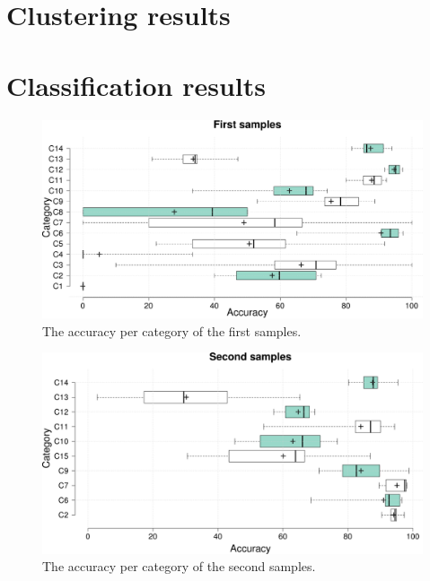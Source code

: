 \label{evaluation}



\section{Clustering results}\label{clusteringEvaluation}

\section{Classification results}\label{classificationEvaluation}

 \begin{figure}[h]
    \centering
    \includegraphics[width =\textwidth]{Images/CM1Boxplot.png}
    \caption{The accuracy per category of the first samples.}
    \label{CM1Boxplot}
\end{figure}

 \begin{figure}[h]
    \centering
    \includegraphics[width =\textwidth]{Images/CM2Boxplot.png}
    \caption{The accuracy per category of the second samples.}
    \label{CM2Boxplot}
\end{figure}

